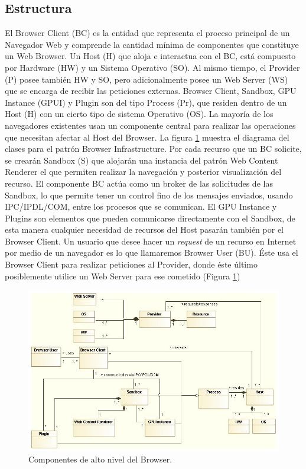 \subsection{Estructura}
El Browser Client (BC) es la entidad que representa el proceso principal de un Navegador Web y comprende la cantidad mínima de componentes que constituye un Web Browser. Un Host (H) que aloja e interactua con el BC, está compuesto por Hardware (HW) y un Sistema Operativo (SO). Al mismo tiempo, el Provider (P) posee también HW y SO, pero adicionalmente posee un Web Server (WS) que se encarga de recibir las peticiones externas. Browser Client, Sandbox, GPU Instance (GPUI) y Plugin son del tipo Process (Pr), que residen dentro de un Host (H) con un cierto tipo de sistema Operativo (OS). La mayoría de los navegadores existentes usan un componente central para realizar las operaciones que necesitan afectar al Host del Browser. La figura \ref{fig:BIPatt} muestra el diagrama del clases para el patrón Browser Infrastructure. Por cada recurso que un BC solicite, se crearán Sandbox (S) que alojarán una instancia del patrón Web Content Renderer el que permiten realizar la navegación y posterior visualización del recurso.
El componente BC actúa como un broker de las solicitudes de las Sandbox, lo que permite tener un control fino de los mensajes enviados, usando IPC/IPDL/COM, entre los procesos que se comunican. El GPU Instance y Plugins son elementos que pueden comunicarse directamente con el Sandbox, de esta manera cualquier necesidad de recursos del Host pasarán también por el Browser Client. 
Un usuario que desee hacer un \textit{request} de un recurso en Internet por medio de un navegador es lo que llamaremos Browser User (BU). Éste usa el Browser Client para realizar peticiones al Provider, donde éste último posiblemente utilice un Web Server para ese cometido (Figura \ref{fig:BIPatt})
	\begin{landscape}
	    \begin{figure}[h!t]
	        \centering
	        \includegraphics[scale=0.73]{figures/chap4/browserInfraPattern_v3.jpg}
	        \caption{Componentes de alto nivel del Browser.}
	        \label{fig:BIPatt}
	    \end{figure}
	\end{landscape}

